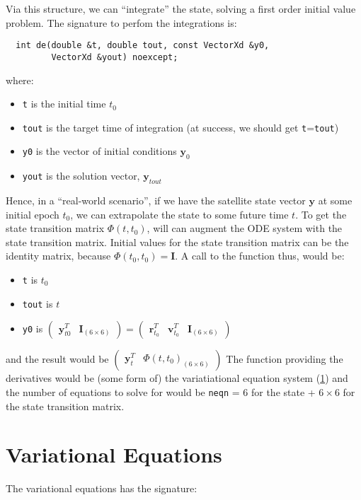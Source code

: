 Via this structure, we can ``integrate'' the state, solving a first order 
initial value problem. The signature to perfom the integrations is:
\begin{lstlisting}
  int de(double &t, double tout, const VectorXd &y0,                     
         VectorXd &yout) noexcept;
\end{lstlisting}
where:
\begin{itemize}
    \item \texttt{t} is the initial time $t_0$
    \item \texttt{tout} is the target time of integration (at success, we 
        should get \texttt{t}=\texttt{tout})
    \item \texttt{y0} is the vector of initial conditions $\bm{y}_0$
    \item \texttt{yout} is the solution vector, $\bm{y}_{tout}$
\end{itemize}

Hence, in a ``real-world scenario'', if we have the satellite state vector 
$\bm{y}$ at some initial epoch $t_0$, we can extrapolate the state to some 
future time $t$. To get the state transition matrix $\Phi (t,t_0)$, will can 
augment the ODE system with the state transition matrix. Initial values for 
the state transition matrix can be the identity matrix, because 
$\Phi (t_0,t_0) = \bm{I}$. A call to the function thus, would be:
\begin{itemize}
    \item \texttt{t} is $t_0$
    \item \texttt{tout} is $t$
    \item \texttt{y0} is 
    $\begin{pmatrix} \bm{y}^T_{t0} & \bm{I}_{(6 \times 6)} \end{pmatrix} = 
    \begin{pmatrix} \bm{r}^T_{t_0} & \bm{v}^T_{t_0} & \bm{I}_{(6 \times 6)} \end{pmatrix}$
\end{itemize}
and the result would be 
$\begin{pmatrix} \bm{y}^T_{t} & \Phi(t,t_0)_{(6 \times 6)} \end{pmatrix}$
The function providing the derivatives would be (some form of) the 
variatiational equation system (\ref{sec:variational-equations}) and the number 
of equations to solve for would be \texttt{neqn} = $6$ for the state + $6 \times 6$ for 
the state transition matrix.


\section{Variational Equations}
\label{sec:variational-equations}
The variational equations has the signature:

